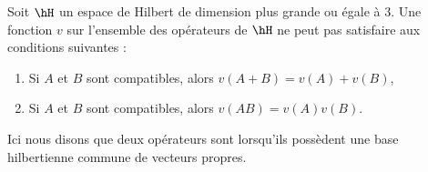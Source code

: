\begin{theorem}
	Soit \( \hH\) un espace de Hilbert de dimension plus grande ou égale à \( 3\). Une fonction \( v\) sur l'ensemble des opérateurs de \( \hH\) ne peut pas satisfaire aux conditions suivantes :
	\begin{enumerate}
		\item
		      Si \( A\) et \( B\) sont compatibles, alors \( v(A+B)=v(A)+v(B)\),
		\item
		      Si \( A\) et \( B\) sont compatibles, alors \( v(AB)=v(A)v(B)\).
	\end{enumerate}
	Ici nous disons que deux opérateurs sont  lorsqu'ils possèdent une base hilbertienne commune de vecteurs propres.
\end{theorem}

